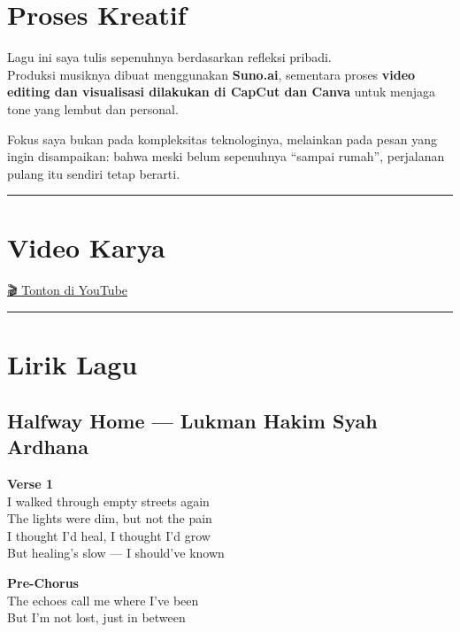 \documentclass[
  letterpaper,
  DIV=11,
  numbers=noendperiod]{scrreprt}
\begin{document}
\section{Proses Kreatif}\label{proses-kreatif}

Lagu ini saya tulis sepenuhnya berdasarkan refleksi pribadi.\\
Produksi musiknya dibuat menggunakan \textbf{Suno.ai}, sementara proses
\textbf{video editing dan visualisasi dilakukan di CapCut dan Canva}
untuk menjaga tone yang lembut dan personal.

Fokus saya bukan pada kompleksitas teknologinya, melainkan pada pesan
yang ingin disampaikan: bahwa meski belum sepenuhnya ``sampai rumah'',
perjalanan pulang itu sendiri tetap berarti.

\begin{center}\rule{0.5\linewidth}{0.5pt}\end{center}

\section{Video Karya}\label{video-karya}

\href{https://youtu.be/qKywgE79b1Q}{🎬 Tonton di YouTube}

\begin{center}\rule{0.5\linewidth}{0.5pt}\end{center}

\section{Lirik Lagu}\label{lirik-lagu}

\subsection{\texorpdfstring{\textbf{Halfway Home --- Lukman Hakim Syah
Ardhana}}{Halfway Home --- Lukman Hakim Syah Ardhana}}\label{halfway-home-lukman-hakim-syah-ardhana}

\textbf{Verse 1}\\
I walked through empty streets again\\
The lights were dim, but not the pain\\
I thought I'd heal, I thought I'd grow\\
But healing's slow --- I should've known

\textbf{Pre-Chorus}\\
The echoes call me where I've been\\
But I'm not lost, just in between
\end{document}
